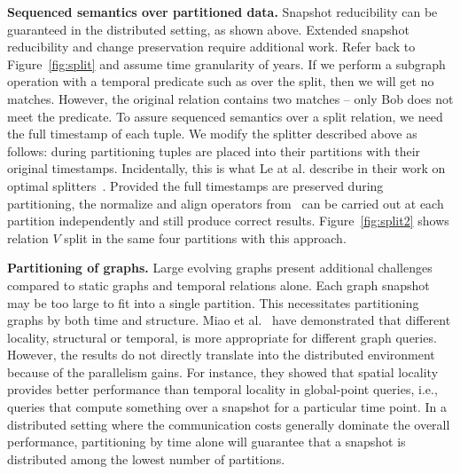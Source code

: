 
{\bf Sequenced semantics over partitioned data.}  Snapshot
reducibility can be guaranteed in the distributed setting, as shown
above.  Extended snapshot reducibility and change preservation require
additional work.  Refer back to Figure~\ref{fig:split} and assume time
granularity of years.  If we perform a subgraph operation with a
temporal predicate such as  over the split, then we
will get no matches.  However, the original relation contains two
matches -- only Bob does not meet the
predicate.  To assure sequenced semantics over a split relation, we
need the full timestamp of each tuple.  We modify the splitter
described above as follows: during partitioning tuples are placed into
their partitions with their original timestamps.  Incidentally, this
is what Le at al. describe in their work on optimal
splitters~\cite{Le2013}.  Provided the full timestamps are preserved
during partitioning, the normalize and align operators
from~\cite{Dignos2012} can be carried out at each partition
independently and still produce correct results.
Figure~\ref{fig:split2} shows relation $V$ split in the same four
partitions with this approach.

{\bf Partitioning of graphs.}  Large evolving graphs present
additional challenges compared to static graphs and temporal relations
alone.  Each graph snapshot may be too large to fit into a single
partition.  This necessitates partitioning graphs by both time and
structure.  Miao et al.~\cite{Miao2015} have demonstrated that
different locality, structural or temporal, is more appropriate for
different graph queries.  However, the results do not directly
translate into the distributed environment because of the parallelism
gains.  For instance, they showed that spatial locality provides
better performance than temporal locality in global-point queries,
i.e., queries that compute something over a snapshot for a particular
time point.  In a distributed setting where the communication costs
generally dominate the overall performance, partitioning by time alone
will guarantee that a snapshot is distributed among the lowest number
of partitions.  


